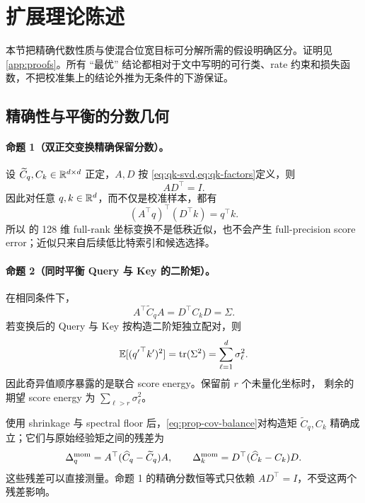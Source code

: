 \section{扩展理论陈述}
\label{app:analysis-statements}

本节把精确代数性质与使混合位宽目标可分解所需的假设明确区分。证明见
\cref{app:proofs}。所有 ``最优'' 结论都相对于文中写明的可行类、rate
约束和损失函数，不把校准集上的结论外推为无条件的下游保证。

\subsection{精确性与平衡的分数几何}

\paragraph{命题 1（双正交变换精确保留分数）。}
设 $\widetilde C_q,C_k\in\mathbb{R}^{d\times d}$ 正定，$A,D$ 按
\cref{eq:qk-svd,eq:qk-factors}定义，则
\begin{equation}
 AD^\top=I.
 \label{eq:prop-biorthogonal}
\end{equation}
因此对任意 $q,k\in\mathbb{R}^d$，而不仅是校准样本，都有
\begin{equation}
 (A^\top q)^\top(D^\top k)=q^\top k.
 \label{eq:prop-score-exact}
\end{equation}
所以 \method 的 128 维 full-rank 坐标变换不是低秩近似，也不会产生
full-precision score error；近似只来自后续低比特索引和候选选择。

\paragraph{命题 2（同时平衡 Query 与 Key 的二阶矩）。}
在相同条件下，
\begin{equation}
 A^\top\widetilde C_qA=D^\top C_kD=\Sigma.
 \label{eq:prop-cov-balance}
\end{equation}
若变换后的 Query 与 Key 按构造二阶矩独立配对，则
\begin{equation}
 \mathbb E[({q'}^\top k')^2]
 =\operatorname{tr}(\Sigma^2)=\sum_{\ell=1}^{d}\sigma_\ell^2.
 \label{eq:score-energy}
\end{equation}
因此奇异值顺序暴露的是联合 score energy。保留前 $r$ 个未量化坐标时，
剩余的期望 score energy 为 $\sum_{\ell>r}\sigma_\ell^2$。

使用 shrinkage 与 spectral floor 后，\cref{eq:prop-cov-balance}对构造矩
$\widetilde C_q,C_k$ 精确成立；它们与原始经验矩之间的残差为
\begin{equation}
 \Delta_q^{\rm mom}
 =A^\top(\widehat C_q-\widetilde C_q)A,\qquad
 \Delta_k^{\rm mom}
 =D^\top(\widehat C_k-C_k)D.
 \label{eq:shrinkage-residual}
\end{equation}
这些残差可以直接测量。命题 1 的精确分数恒等式只依赖
$AD^\top=I$，不受这两个残差影响。

